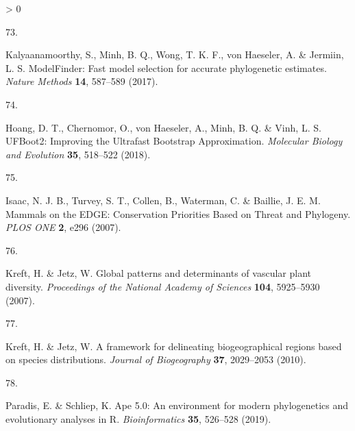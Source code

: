 \documentclass[10pt,oneside]{article}
\newlength{\cslhangindent}
\newlength{\csllabelwidth}
\newenvironment{CSLReferences}[3] %
 {%
  \setlength{\parindent}{0pt}
  \ifodd #1 \everypar{\setlength{\hangindent}{\cslhangindent}}\ignorespaces\fi
  \ifnum #2 > 0
  \setlength{\parskip}{#2\baselineskip}
  \fi
 }%
 {}
\newcommand{\CSLLeftMargin}[1]{\parbox[t]{\maxof{\widthof{#1}}{\csllabelwidth}}{#1}}
\newcommand{\CSLRightInline}[1]{\parbox[t]{\linewidth}{#1}}
\begin{document}
\begin{CSLReferences}{0}{0}
\leavevmode\hypertarget{ref-Kalyaanamoorthy2017Modelfinder}{}%
\CSLLeftMargin{73. }
\CSLRightInline{Kalyaanamoorthy, S., Minh, B. Q., Wong, T. K. F., von
Haeseler, A. \& Jermiin, L. S. ModelFinder: Fast model selection for
accurate phylogenetic estimates. \emph{Nature Methods} \textbf{14},
587--589 (2017).}

\leavevmode\hypertarget{ref-Hoang2018Ufboot2}{}%
\CSLLeftMargin{74. }
\CSLRightInline{Hoang, D. T., Chernomor, O., von Haeseler, A., Minh, B.
Q. \& Vinh, L. S. UFBoot2: Improving the Ultrafast Bootstrap
Approximation. \emph{Molecular Biology and Evolution} \textbf{35},
518--522 (2018).}

\leavevmode\hypertarget{ref-Isaac2007Mammals}{}%
\CSLLeftMargin{75. }
\CSLRightInline{Isaac, N. J. B., Turvey, S. T., Collen, B., Waterman, C.
\& Baillie, J. E. M. Mammals on the EDGE: Conservation Priorities Based
on Threat and Phylogeny. \emph{PLOS ONE} \textbf{2}, e296 (2007).}

\leavevmode\hypertarget{ref-Kreft2007Global}{}%
\CSLLeftMargin{76. }
\CSLRightInline{Kreft, H. \& Jetz, W. Global patterns and determinants
of vascular plant diversity. \emph{Proceedings of the National Academy
of Sciences} \textbf{104}, 5925--5930 (2007).}

\leavevmode\hypertarget{ref-Kreft2010Framework}{}%
\CSLLeftMargin{77. }
\CSLRightInline{Kreft, H. \& Jetz, W. A framework for delineating
biogeographical regions based on species distributions. \emph{Journal of
Biogeography} \textbf{37}, 2029--2053 (2010).}

\leavevmode\hypertarget{ref-Paradis2019Ape}{}%
\CSLLeftMargin{78. }
\CSLRightInline{Paradis, E. \& Schliep, K. Ape 5.0: An environment for
modern phylogenetics and evolutionary analyses in R.
\emph{Bioinformatics} \textbf{35}, 526--528 (2019).}

\end{CSLReferences}
\end{document}
